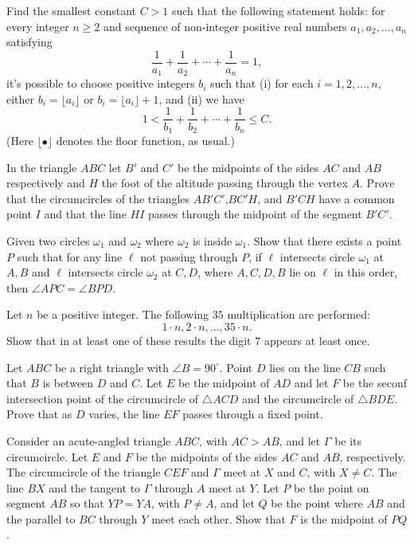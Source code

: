 \documentclass[11pt]{scrartcl}
\begin{document}
\begin{problem}[7229423492681245326]
Find the smallest constant $C > 1$ such that the following statement holds: for every integer $n \geq 2$ and sequence of non-integer positive real numbers $a_1, a_2, \dots, a_n$ satisfying$$\frac{1}{a_1} + \frac{1}{a_2} + \cdots + \frac{1}{a_n} = 1,$$it's possible to choose positive integers $b_i$ such that
(i) for each $i = 1, 2, \dots, n$, either $b_i = \lfloor a_i \rfloor$ or $b_i = \lfloor a_i \rfloor + 1$, and
(ii) we have$$1 < \frac{1}{b_1} + \frac{1}{b_2} + \cdots + \frac{1}{b_n} \leq C.$$(Here $\lfloor \bullet \rfloor$ denotes the floor function, as usual.)
\end{problem}
\begin{problem}[7243491713649826569]
In the triangle $ABC$ let $B'$ and $C'$ be the midpoints of the sides $AC$ and $AB$ respectively and $H$ the foot of the altitude passing through the vertex $A$. Prove that the circumcircles of the triangles $AB'C'$,$BC'H$, and $B'CH$ have a common point $I$ and that the line $HI$ passes through the midpoint of the segment $B'C'.$
\end{problem}
\begin{problem}[7268978143074030034]
Given two circles $\omega_1$ and $\omega_2$ where $\omega_2$ is inside $\omega_1$. Show that there exists a point $P$ such that for any line $\ell$ not passing through $P$, if $\ell$ intersects circle $\omega_1$ at $A,B$ and $\ell$ intersects circle $\omega_2$ at $C,D$, where $A,C,D,B$ lie on $\ell$ in this order, then $\angle APC=\angle BPD$.
\end{problem}
\begin{problem}[7284124089748055531]
Let $n$ be a positive integer. The following $35$ multiplication are performed:
$$1 \cdot n, 2 \cdot n, \dots, 35 \cdot n.$$Show that in at least one of these results the digit $7$ appears at least once.
\end{problem}
\begin{problem}[7335226310540156292]
	Let $ABC$ be a right triangle with $\angle B=90^{\circ}$. Point $D$ lies on the line $CB$ such that $B$ is between $D$ and $C$. Let $E$ be the midpoint of $AD$ and let $F$ be the seconf intersection point of the circumcircle of $\triangle ACD$ and the circumcircle of $\triangle BDE$. Prove that as $D$ varies, the line $EF$ passes through a fixed point.
\end{problem}
\begin{problem}[7351162576557167474]
Consider an acute-angled triangle $ABC$, with $AC>AB$, and let $\Gamma$ be its circumcircle. Let $E$ and $F$ be the midpoints of the sides $AC$ and $AB$, respectively. The circumcircle of the triangle $CEF$ and $\Gamma$ meet at $X$ and $C$, with $X\neq C$. The line $BX$ and the tangent to $\Gamma$ through $A$ meet at $Y$. Let $P$ be the point on segment $AB$ so that $YP = YA$, with $P\neq A$, and let $Q$ be the point where $AB$ and the parallel to $BC$ through $Y$ meet each other. Show that $F$ is the midpoint of $PQ$.
\end{problem}
\end{document}
